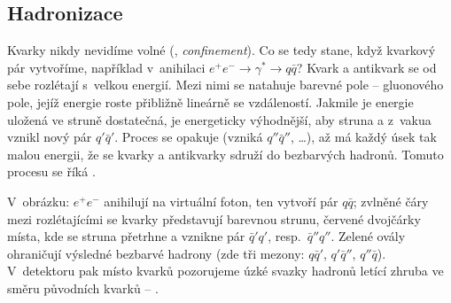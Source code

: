 \subsection{Hadronizace}

Kvarky nikdy nevidíme volné (, \emph{confinement}). Co se tedy stane, když kvarkový pár vytvoříme, například v~anihilaci $e^+e^- \to \gamma^* \to q\bar q$? Kvark a antikvark se od sebe rozlétají s~velkou energií. Mezi nimi se natahuje barevné pole --  gluonového pole, jejíž energie roste přibližně lineárně se vzdáleností. Jakmile je energie uložená ve struně dostatečná, je energeticky výhodnější, aby struna  a z~vakua vznikl nový pár $q'\bar q'$. Proces se opakuje (vzniká $q''\bar q''$, \dots), až má každý úsek tak malou energii, že se kvarky a antikvarky sdruží do bezbarvých hadronů. Tomuto procesu se říká .
\begin{center}
\end{center}
V~obrázku: $e^+e^-$ anihilují na virtuální foton, ten vytvoří pár $q\bar q$; zvlněné čáry mezi rozlétajícími se kvarky představují barevnou strunu, červené dvojčárky místa, kde se struna přetrhne a vznikne pár $\bar q' q'$, resp.\ $\bar q'' q''$. Zelené ovály ohraničují výsledné bezbarvé hadrony (zde tři mezony: $q\bar q'$, $q'\bar q''$, $q''\bar q$). V~detektoru pak místo kvarků pozorujeme úzké svazky hadronů letící zhruba ve směru původních kvarků -- .

